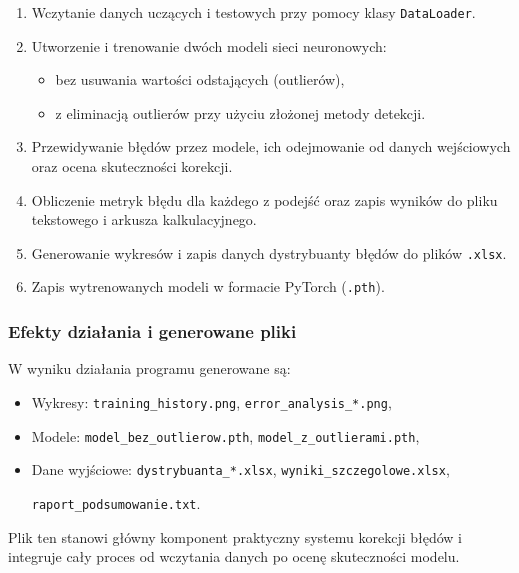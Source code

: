 \documentclass{classrep}
\begin{document}
\begin{enumerate}
	\item Wczytanie danych uczących i testowych przy pomocy klasy \texttt{DataLoader}.

	\item Utworzenie i trenowanie dwóch modeli sieci neuronowych:
	      \begin{itemize}
		      \item bez usuwania wartości odstających (outlierów),
		      \item z eliminacją outlierów przy użyciu złożonej metody detekcji.
	      \end{itemize}

	\item Przewidywanie błędów przez modele, ich odejmowanie od danych wejściowych oraz ocena skuteczności korekcji.

	\item Obliczenie metryk błędu dla każdego z podejść oraz zapis wyników do pliku tekstowego i arkusza kalkulacyjnego.

	\item Generowanie wykresów i zapis danych dystrybuanty błędów do plików \texttt{.xlsx}.

	\item Zapis wytrenowanych modeli w formacie PyTorch (\texttt{.pth}).
\end{enumerate}

\subsubsection*{Efekty działania i generowane pliki}

W wyniku działania programu generowane są:

\begin{itemize}
	\item Wykresy: \texttt{training\_history.png}, \texttt{error\_analysis\_*.png},
	\item Modele: \texttt{model\_bez\_outlierow.pth}, \texttt{model\_z\_outlierami.pth},
	\item Dane wyjściowe: \texttt{dystrybuanta\_*.xlsx}, \texttt{wyniki\_szczegolowe.xlsx},

	      \texttt{raport\_podsumowanie.txt}.
\end{itemize}

Plik ten stanowi główny komponent praktyczny systemu korekcji błędów i integruje cały proces od wczytania danych po ocenę skuteczności modelu.
\end{document}
